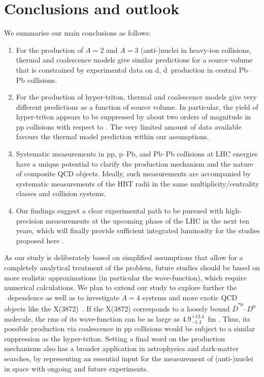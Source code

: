 \documentclass[%
 reprint,
 amsmath,amssymb,
 aps,
]{revtex4-1}
\begin{document}
\section{Conclusions and outlook}
We summarise our main conclusions as follows:
\begin{enumerate}
	\item For the production of $A=2$ and $A=3$ \mbox{(anti-)nuclei} in heavy-ion collisions, thermal and coalescence models give similar predictions for a source volume that is constrained by experimental data on d, $\bar{\mathrm{d}}$~production in central Pb--Pb collisions.
	\item For the production of hyper-triton, thermal and coalescence models give very different predictions as a function of source volume. In particular, the yield of hyper-triton appears to be suppressed by about two orders of magnitude in pp collisions with respect to \hethree. The very limited amount of data available favours the thermal model prediction within our assumptions.
	\item Systematic measurements in pp, p--Pb, and Pb--Pb collisions at LHC energies have a unique potential to clarify the production mechanism and the nature of composite QCD objects. Ideally, such measurements are accompanied by systematic measurements of the HBT radii in the same multiplicity/centrality classes and collision systems.
	\item Our findings suggest a clear experimental path to be pursued with high-precision measurements at the upcoming phase of the LHC in the next ten years, which will finally provide sufficient integrated luminosity for the studies proposed here \cite{Citron:2018lsq}.

\end{enumerate}
As our study is deliberately based on simplified assumptions that allow for a completely analytical treatment of the problem, future studies should be based on more realistic approximations (in particular the wave-function), which require numerical calculations. 
We plan to extend our study to explore further the \pt~dependence as well as to investigate $A=4$ systems and more exotic QCD objects like the X(3872)~\cite{Esposito:2015fsa, Cho:2017dcy}. 
If the X(3872) corresponds to a loosely bound $\overline{D}^{*0}$--$D^{0}$ molecule, the rms of its wave-function can be as large as $4.9^{+13.4}_{-1.4}$~fm \cite{Artoisenet:2010uu}. Thus, its possible production via coalescence in pp collisions would be subject to a similar suppression as the hyper-triton. 
Setting a final word on the production mechanisms also has a broader application in astrophysics and dark-matter searches, by representing an essential input for the measurement of (anti-)nuclei in space with ongoing \cite{Alcaraz:2000ss, Poulin:2018wzu} and future \cite{AMS100, Aramaki:2015laa} experiments. 
\end{document}

